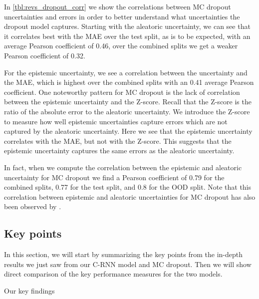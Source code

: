 In \cref{tbl:revs_dropout_corr} we show the correlations between MC dropout uncertainties and errors in order to better understand what uncertainties the dropout model captures. 
Starting with the aleatoric uncertainty, we can see that it correlates best with the MAE over the test split, as is to be expected, with an average Pearson coefficient of 0.46, over the combined splits we get a weaker Pearson coefficient of 0.32. 

For the epistemic uncertainty, we see a correlation between the uncertainty and the MAE, which is highest over the combined splits with an 0.41 average Pearson coefficient. One noteworthy pattern for MC dropout is the lack of correlation between the epistemic uncertainty and the Z-score. Recall that the Z-score is the ratio of the absolute error to the aleatoric uncertainty. We introduce the Z-score to measure how well epistemic uncertainties capture errors which are not captured by the aleatoric uncertainty. Here we see that the epistemic uncertainty correlates with the MAE, but not with the Z-score. This suggests that the epistemic uncertainty captures the same errors as the aleatoric uncertainty. 

In fact, when we compute the correlation between the epistemic and aleatoric uncertainty for MC dropout we find a Pearson coefficient of 0.79 for the combined splits, 0.77 for the test split, and 0.8 for the OOD split. Note that this correlation between epistemic and aleatoric uncertainties for MC dropout has also been observed by \cite{kendall2017uncertainties}.


\subsection{Key points}

In this section, we will start by summarizing the key points from the in-depth results we just saw from our C-RNN model and MC dropout. Then we will show direct comparison of the key performance measures for the two models.

Our key findings 

